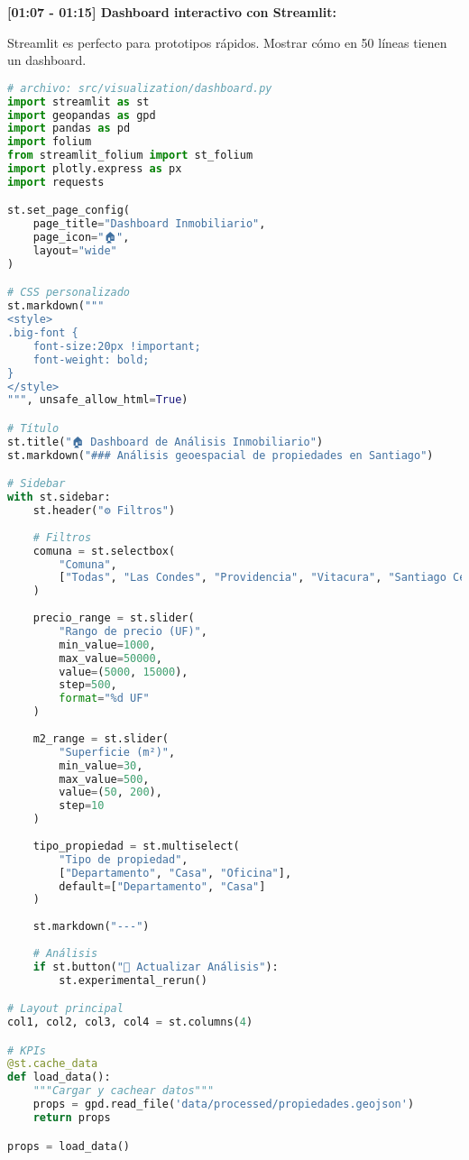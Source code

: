 \documentclass[11pt,a4paper]{article}
\begin{document}
\textbf{[01:07 - 01:15] Dashboard interactivo con Streamlit:}

\begin{tipbox}
Streamlit es perfecto para prototipos rápidos. Mostrar cómo en 50 líneas tienen un dashboard.
\end{tipbox}

\begin{lstlisting}[language=Python]
# archivo: src/visualization/dashboard.py
import streamlit as st
import geopandas as gpd
import pandas as pd
import folium
from streamlit_folium import st_folium
import plotly.express as px
import requests

st.set_page_config(
    page_title="Dashboard Inmobiliario",
    page_icon="🏠",
    layout="wide"
)

# CSS personalizado
st.markdown("""
<style>
.big-font {
    font-size:20px !important;
    font-weight: bold;
}
</style>
""", unsafe_allow_html=True)

# Título
st.title("🏠 Dashboard de Análisis Inmobiliario")
st.markdown("### Análisis geoespacial de propiedades en Santiago")

# Sidebar
with st.sidebar:
    st.header("⚙️ Filtros")
    
    # Filtros
    comuna = st.selectbox(
        "Comuna",
        ["Todas", "Las Condes", "Providencia", "Vitacura", "Santiago Centro"]
    )
    
    precio_range = st.slider(
        "Rango de precio (UF)",
        min_value=1000,
        max_value=50000,
        value=(5000, 15000),
        step=500,
        format="%d UF"
    )
    
    m2_range = st.slider(
        "Superficie (m²)",
        min_value=30,
        max_value=500,
        value=(50, 200),
        step=10
    )
    
    tipo_propiedad = st.multiselect(
        "Tipo de propiedad",
        ["Departamento", "Casa", "Oficina"],
        default=["Departamento", "Casa"]
    )
    
    st.markdown("---")
    
    # Análisis
    if st.button("🔄 Actualizar Análisis"):
        st.experimental_rerun()

# Layout principal
col1, col2, col3, col4 = st.columns(4)

# KPIs
@st.cache_data
def load_data():
    """Cargar y cachear datos"""
    props = gpd.read_file('data/processed/propiedades.geojson')
    return props

props = load_data()


\end{lstlisting}
\end{document}
